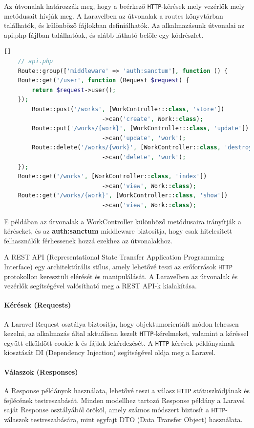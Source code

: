 Az útvonalak határozzák meg, hogy a beérkező \texttt{HTTP}-kérések mely vezérlők mely metódusait hívják meg. A Laravelben az útvonalak a routes könyvtárban találhatók, és különböző fájlokban definiálhatók. Az alkalmazásunk útvonalai az api.php fájlban találhatóak, és alább látható belőle egy kódrészlet.
\begin{lstlisting}[language=php][]
    // api.php
    Route::group(['middleware' => 'auth:sanctum'], function () {
    Route::get('/user', function (Request $request) {
        return $request->user();
    });
        Route::post('/works', [WorkController::class, 'store'])
                            ->can('create', Work::class);
        Route::put('/works/{work}', [WorkController::class, 'update'])
                            ->can('update', 'work');
        Route::delete('/works/{work}', [WorkController::class, 'destroy'])
                            ->can('delete', 'work');
    });
    Route::get('/works', [WorkController::class, 'index'])
                            ->can('view', Work::class);
    Route::get('/works/{work}', [WorkController::class, 'show'])
                            ->can('view', Work::class);
\end{lstlisting}

E példában az útvonalak a WorkController különböző metódusaira irányítják a kéréseket, és az \textbf{auth:sanctum} middleware biztosítja, hogy csak hitelesített felhasználók férhessenek hozzá ezekhez az útvonalakhoz.

A REST API (Representational State Transfer Application Programming Interface) egy architektúrális stílus, amely lehetővé teszi az erőforrások \texttt{HTTP} protokollon keresztüli elérését és manipulálását. A Laravelben az útvonalak és vezérlők segítségével valósítható meg a REST API-k kialakítása.


\paragraph{Kérések (Requests)}
A Laravel Request osztálya biztosítja, hogy objektumorientált módon lehessen kezelni, az alkalmazás által aktuálisan kezelt \texttt{HTTP}-kérelmeket, valamint a kéréssel együtt elküldött cookie-k és fájlok lekérdezését. A \texttt{HTTP} kérések példányainak kiosztását DI (Dependency Injection) segítségével oldja meg a Laravel.

\paragraph{Válaszok (Responses)}
A Response példányok használata, lehetővé teszi a válasz \texttt{HTTP} státuszkódjának és fejlécének testreszabását. Minden modellhez tartozó Response példány a Laravel saját Response osztályából örököl, amely számos módszert biztosít a \texttt{HTTP}-válaszok testreszabására, mint egyfajt DTO (Data Transfer Object) használata.


